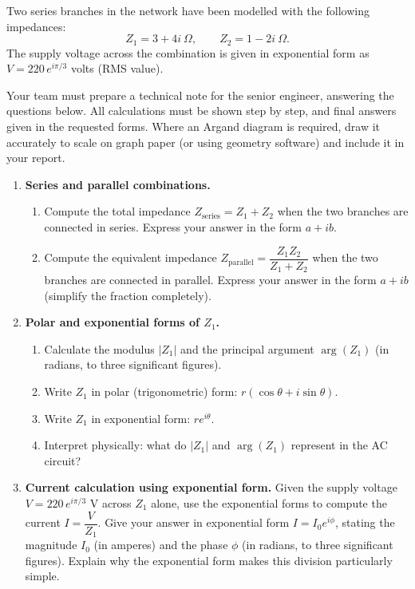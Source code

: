 \documentclass[11pt]{article}
\newcounter{popsec}
\newcounter{popsub}
\newcommand{\courssub}[1]{%
  \stepcounter{popsub}%
  \par\vspace{9pt}\noindent{\popxbold\fontsize{11.5}{13}\selectfont\color{popink}{\color{poporange}\thepopsec.\thepopsub}\hspace{6pt}#1}\par\nopagebreak\vspace{4pt}
}
\begin{document}
Two series branches in the network have been modelled with the following impedances:
\[
Z_1 = 3 + 4i\ \Omega, \qquad Z_2 = 1 - 2i\ \Omega.
\]
The supply voltage across the combination is given in exponential form as $V = 220\, e^{i\pi/3}$ volts (RMS value).

Your team must prepare a technical note for the senior engineer, answering the questions below. All calculations must be shown step by step, and final answers given in the requested forms. Where an Argand diagram is required, draw it accurately to scale on graph paper (or using geometry software) and include it in your report.

\courssub{Tasks}
\begin{enumerate}
    \item \textbf{Series and parallel combinations.}
    \begin{enumerate}
        \item Compute the total impedance $Z_{\text{series}} = Z_1 + Z_2$ when the two branches are connected in series. Express your answer in the form $a+ib$.
        \item Compute the equivalent impedance $Z_{\text{parallel}} = \dfrac{Z_1 Z_2}{Z_1 + Z_2}$ when the two branches are connected in parallel. Express your answer in the form $a+ib$ (simplify the fraction completely).
    \end{enumerate}

    \item \textbf{Polar and exponential forms of $Z_1$.}
    \begin{enumerate}
        \item Calculate the modulus $|Z_1|$ and the principal argument $\arg(Z_1)$ (in radians, to three significant figures).
        \item Write $Z_1$ in polar (trigonometric) form: $r(\cos\theta + i\sin\theta)$.
        \item Write $Z_1$ in exponential form: $r e^{i\theta}$.
        \item Interpret physically: what do $|Z_1|$ and $\arg(Z_1)$ represent in the AC circuit?
    \end{enumerate}

    \item \textbf{Current calculation using exponential form.}
    Given the supply voltage $V = 220\, e^{i\pi/3}$ V across $Z_1$ alone, use the exponential forms to compute the current $I = \dfrac{V}{Z_1}$. Give your answer in exponential form $I = I_0 e^{i\phi}$, stating the magnitude $I_0$ (in amperes) and the phase $\phi$ (in radians, to three significant figures). Explain why the exponential form makes this division particularly simple.


\end{enumerate}
\end{document}
